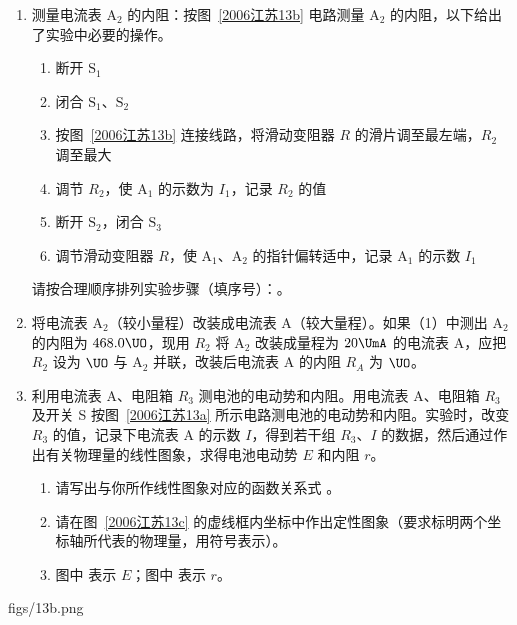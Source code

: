 \documentclass[\gkver]{gaokaozhenti}
\begin{document}
\begin{enumerate}
\begin{enumerate}
	\item
	测量电流表 $\mathrm{A}_{2}$ 的内阻：按图~\ref{2006江苏13b} 电路测量 $\mathrm{A}_{2}$ 的内阻，以下给出了实验中必要的操作。
	\begin{enumerate}[label=(\Alph*)]
		\item
		断开 $\mathrm{S}_{1}$
		\item
		闭合 $\mathrm{S}_{1}$、$\mathrm{S}_{2}$
		\item
		按图~\ref{2006江苏13b} 连接线路，将滑动变阻器 $R$ 的滑片调至最左端，$R_{2}$ 调至最大
		\item
		调节 $R_{2}$，使 $\mathrm{A}_{1}$ 的示数为 $I_{1}$，记录 $R_{2}$ 的值
		\item
		断开 $\mathrm{S}_{2}$，闭合 $\mathrm{S}_{3}$
		\item
		调节滑动变阻器 $R$，使 $\mathrm{A}_{1}$、$\mathrm{A}_{2}$ 的指针偏转适中，记录 $\mathrm{A}_{1}$ 的示数 $I_{1}$
	\end{enumerate}
	请按合理顺序排列实验步骤（填序号）：\tkanswer[3cm]{}。
	\item
	将电流表 $\mathrm{A}_{2}$（较小量程）改装成电流表 A（较大量程）。如果（1）中测出 $\mathrm{A}_{2}$ 的内阻为 $468.0\UO$，现用 $R_{2}$ 将 $\mathrm{A}_{2}$ 改装成量程为 $20\UmA$ 的电流表 A，应把 $R_{2}$ 设为 \tkanswer[1.5cm]{}$\UO$ 与 $\mathrm{A}_{2}$ 并联，改装后电流表 A 的内阻 $R_{A}$ 为 \tkanswer[1.5cm]{}$\UO$。
	\item
	利用电流表 A、电阻箱 $R_{3}$ 测电池的电动势和内阻。用电流表 A、电阻箱 $R_{3}$ 及开关 S 按图~\ref{2006江苏13a} 所示电路测电池的电动势和内阻。实验时，改变 $R_{3}$ 的值，记录下电流表 A 的示数 $I$，得到若干组 $R_{3}$、$I$ 的数据，然后通过作出有关物理量的线性图象，求得电池电动势 $E$ 和内阻 $r$。
	\begin{enumerate}[label=\alph*.]
		\item
		请写出与你所作线性图象对应的函数关系式 \tkanswer[3cm]{}。
		\item
		请在图~\ref{2006江苏13c} 的虚线框内坐标中作出定性图象（要求标明两个坐标轴所代表的物理量，用符号表示）。
		\item
		图中 \tkanswer[1.5cm]{} 表示 $E$；图中 \tkanswer[1.5cm]{} 表示 $r$。
	\end{enumerate}
\end{enumerate}

{figs/13b.png}
{}


\end{enumerate}
\end{document}
